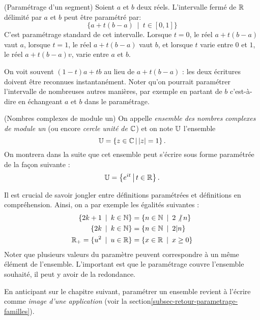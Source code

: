 \begin{exemple} (Paramétrage d'un segment) 
Soient $a$ et $b$ deux réels. L'intervalle fermé de $\mathbb{R}$ délimité par $a$ et $b$ peut être paramétré par:
\[ \{a+t(b-a)\:\mid\: t\in [0,1]\}\]
C'est paramétrage standard de cet intervalle. Lorsque $t=0$, le réel $a+t(b-a)$ vaut $a$, lorsque $t=1$, le réel $a+t(b-a)$ vaut $b$, et lorsque $t$ varie entre $0$ et $1$, le réel $a+t(b-a)v$, varie entre $a$ et $b$.

On voit souvent $(1-t)a+tb$ au lieu de $a+t(b-a)$ : les deux écritures doivent être reconnues instantanément. Noter qu'on pourrait paramétrer l'intervalle de nombreuses autres manières, par exemple en \og partant de $b$\fg{} c'est-à-dire en échangeant $a$ et $b$ dans le paramétrage.
\end{exemple}

\begin{exemple} (Nombres complexes de module un) 
 On appelle \emph{ensemble des nombres complexes de module un} (ou encore \emph{cercle unité de $\mathbb{C}$}) et on note $\mathbb{U}$ l'ensemble 
\[ \U = \ensemble{ z\in \C}{|z|=1}.\]
 On montrera dans la suite que cet ensemble peut s'écrire sous forme paramétrée de la façon suivante :
\[ \U = \ensemble{ e^{it}}{t \in \R}.\]
\end{exemple}

\begin{exemple}
Il est crucial de savoir jongler entre définitions paramétrées et définitions en compréhension. Ainsi, on a par exemple les égalités suivantes :
\begin{align*}
\left\{2k+1 \:\mid\: k\in \N\right\}  &= \left\{ n\in \N\:\mid\: 2\not|\: n\right\} \\
\left\{2k \:\mid\: k\in \N\right\} &=  \left\{ n\in \N\:\mid\: 2| n\right\}\\
\R_+ = \{u^2\:\mid\: u\in \R\} & = \{x\in \R\:\mid\: x\geq 0\}
\end{align*}
Noter que plusieurs valeurs du paramètre peuvent correspondre à un même élément de l'ensemble. L'important est que le paramétrage \og couvre\fg{} l'ensemble souhaité, il peut y avoir de la redondance.
\end{exemple}



\begin{remarque}
En anticipant sur le chapitre suivant, paramétrer un ensemble revient à l'écrire comme \emph{image d'une application} (voir la section\ref{subsec-retour-parametrage-familles}).
\end{remarque}




